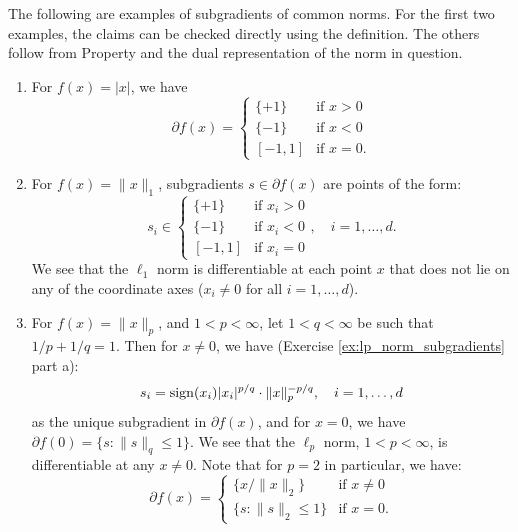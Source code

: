 \begin{Example}
\label{xa:norm_subgradients}
The following are examples of subgradients of common norms. For the first two
examples, the claims can be checked directly using the definition. The others
follow from Property  and the dual
representation of the norm in question. %

\begin{enumerate}[label=\alph*., ref=\alph*]
\item For $f(x) = |x|$, we have 
  \[
  \partial f(x) = \begin{cases}
  \{+1\} & \text{if $x > 0$} \\
  \{-1\} & \text{if $x < 0$} \\
  [-1,1] & \text{if $x = 0$}.
  \end{cases}
  \]

\item {}
  For $f(x) = \|x\|_1$, subgradients $s \in \partial f(x)$ are points of the
  form:  
  \[
  s_i \in \begin{cases}
  \{+1\} & \text{if $x_i > 0$} \\
  \{-1\} & \text{if $x_i < 0$} \\
  [-1,1] & \text{if $x_i = 0$}
  \end{cases}, \quad i=1,\ldots,d.
  \]
  We see that the $\ell_1$ norm is differentiable at each point $x$ that does
  not lie on any of the coordinate axes ($x_i \not=0$ for all 
  $i=1,\ldots,d$).  

\item {}
  For $f(x) = \|x\|_p$, and $1 < p < \infty$, let $1 < q < \infty$ be such that
  $1/p + 1/q = 1$. Then for $x \not= 0$, we have (Exercise
  \ref{ex:lp_norm_subgradients} part a):   
  \[
  s_i = \operatorname{sign}(x_i) |x_i|^{p/q} \cdot \|x\|_p^{-p/q}, \quad i=1,\ldots,d 
  \]
  as the unique subgradient in $\partial f(x)$, and for $x=0$, we have $\partial
  f(0) = \{s : \|s\|_q \leq 1\}$. We see that the $\ell_p$ norm, $1 < p <
  \infty$, is differentiable at any $x \not= 0$. Note that for $p=2$ in
  particular, we have:
  \[
  \partial f(x) = \begin{cases}
  \{x / \|x\|_2\} & \text{if $x \not= 0$} \\
  \{s : \|s\|_2 \leq 1\} & \text{if $x = 0$}.
  \end{cases}
  \]


\end{enumerate}
\end{Example}
